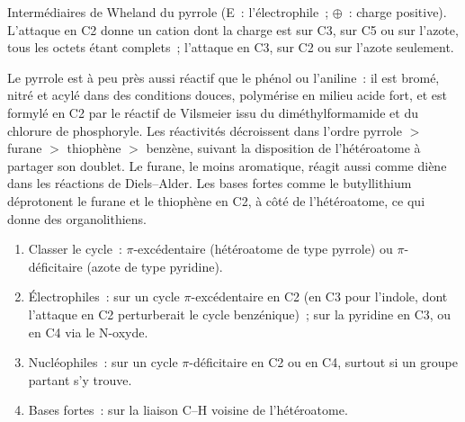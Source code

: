 \begin{omfigure}

{\small Intermédiaires de Wheland du pyrrole (E~: l'électrophile~; $\oplus$~: charge positive).
L'attaque en C2 donne un cation dont la charge est sur C3, sur C5 ou sur
l'azote, tous les octets étant complets~; l'attaque en C3, sur C2 ou sur
l'azote seulement.}
\end{omfigure}

Le pyrrole est à peu près aussi réactif que le phénol ou l'aniline~: il est
bromé, nitré et acylé dans des conditions douces, polymérise en milieu
acide fort, et est formylé en C2 par le réactif de Vilsmeier issu du
diméthylformamide et du chlorure de phosphoryle. Les réactivités décroissent dans l'ordre pyrrole $>$ furane $>$ thiophène $>$ benzène,
suivant la disposition de l'hétéroatome à partager son doublet. Le furane,
le moins aromatique, réagit aussi comme diène dans les réactions de
Diels--Alder. Les bases fortes comme le butyllithium déprotonent le furane
et le thiophène en C2, à côté de l'hétéroatome, ce qui donne des
organolithiens.

\begin{method}\label{met:b3:heterocycles:site}
\begin{enumerate}
  \item Classer le cycle~: $\pi$-excédentaire (hétéroatome de type pyrrole) ou $\pi$-déficitaire
        (azote de type pyridine).
  \item Électrophiles~: sur un cycle $\pi$-excédentaire en C2 (en C3 pour l'indole, dont l'attaque en C2
        perturberait le cycle benzénique)~; sur la pyridine en C3, ou en C4 via
        le N-oxyde.
  \item Nucléophiles~: sur un cycle $\pi$-déficitaire en C2 ou en C4, surtout si un groupe
        partant s'y trouve.
  \item Bases fortes~: sur la liaison C--H voisine de l'hétéroatome.
\end{enumerate}
\end{method}

